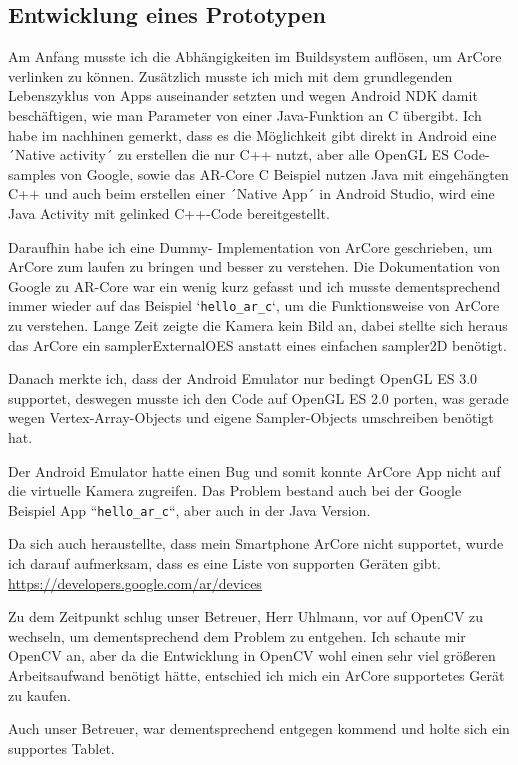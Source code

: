 \subsection{Entwicklung eines Prototypen}
Am Anfang musste ich die Abhängigkeiten im Buildsystem auflösen, um
ArCore verlinken zu können. Zusätzlich musste ich mich mit dem grundlegenden Lebenszyklus von Apps
auseinander setzten und wegen Android NDK damit beschäftigen, wie man
Parameter von einer Java-Funktion an C übergibt.
Ich habe im nachhinen gemerkt, dass es die Möglichkeit gibt direkt in Android eine
´Native activity´ zu erstellen die nur C++ nutzt, aber alle OpenGL ES Code-samples von Google,
sowie das AR-Core C Beispiel nutzen Java mit eingehängten C++ und auch beim erstellen einer
´Native App´ in Android Studio, wird eine Java Activity mit gelinked C++-Code bereitgestellt.
\par
Daraufhin habe ich eine Dummy-
Implementation von ArCore geschrieben, um ArCore zum laufen zu bringen und besser zu verstehen.
Die Dokumentation von Google zu AR-Core war ein wenig kurz gefasst und ich musste dementsprechend immer wieder auf das Beispiel `\verb|hello_ar_c|`, um die Funktionsweise von ArCore zu verstehen.
Lange Zeit zeigte die Kamera kein Bild an, dabei stellte sich heraus das ArCore ein samplerExternalOES anstatt eines einfachen sampler2D benötigt.
\par
Danach merkte ich, dass der Android Emulator nur bedingt OpenGL ES 3.0 supportet,
deswegen musste ich den Code auf OpenGL ES 2.0 porten, was gerade wegen
Vertex-Array-Objects und eigene Sampler-Objects
umschreiben benötigt hat.
\par
Der Android Emulator hatte einen Bug und somit konnte ArCore App nicht
auf die virtuelle Kamera zugreifen. Das Problem bestand auch bei der Google Beispiel App
``\verb|hello_ar_c|``, aber auch in der Java Version.
\par
Da sich auch heraustellte, dass mein Smartphone ArCore nicht supportet, wurde ich darauf
aufmerksam, dass es eine Liste von supporten Geräten gibt. \url{https://developers.google.com/ar/devices}
\par
Zu dem Zeitpunkt schlug unser Betreuer, Herr Uhlmann, vor auf OpenCV zu wechseln, um dementsprechend dem Problem
zu entgehen. Ich schaute mir OpenCV an, aber da die Entwicklung in OpenCV wohl einen sehr viel
größeren Arbeitsaufwand benötigt hätte, entschied ich mich ein ArCore supportetes Gerät zu kaufen.
\par
Auch unser Betreuer, war dementsprechend entgegen kommend und holte sich ein supportes Tablet.

